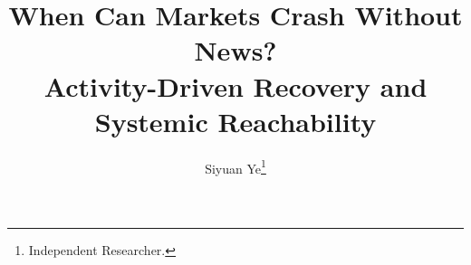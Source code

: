 \usepackage{microtype,xurl,needspace}
\usepackage{amsmath,amsfonts,amssymb,mathtools,bm}
\usepackage{graphicx,booktabs,enumitem,tabularx,placeins}
\usepackage[numbers,sort&compress]{natbib}
\ifnum{}
  \renewcommand{\footercopyright}{}
  \setlength{\headheight}{14pt}
\else
  \usepackage{amsthm}
  \usepackage[hidelinks]{hyperref}
  \usepackage[margin=1in]{geometry}
  \newtheorem{theorem}{Theorem}[section]
  \newtheorem{lemma}[theorem]{Lemma}
  \newtheorem{proposition}[theorem]{Proposition}
  \newtheorem{corollary}[theorem]{Corollary}
  \newtheorem{definition}[theorem]{Definition}
  \newtheorem{assumption}[theorem]{Assumption}
  \newtheorem{remark}[theorem]{Remark}
  \newcommand{\headers}[2]{}
  \newenvironment{keywords}{\noindent\textbf{Keywords.} }{\par}
  \newenvironment{MSCcodes}{\noindent\textbf{MSC codes.} }{\par}
\fi
\title{When Can Markets Crash Without News?\\Activity-Driven Recovery and Systemic Reachability}
\author{Siyuan Ye\thanks{Independent Researcher.}}
\setlength{\emergencystretch}{2em}
\newcommand{\dd}{\,\mathrm{d}}
\newcommand{\Cris}{\mathcal{C}}
\newcommand{\one}{\mathbf{1}}
\newcommand{\pos}[1]{\left[#1\right]_+}
\newcommand{\TV}{\operatorname{TV}}